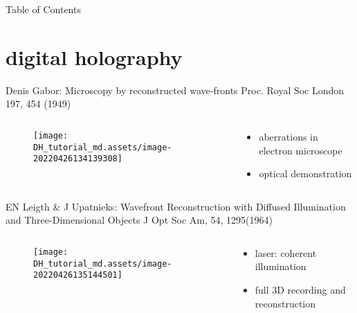 \documentclass[t, aspectratio=169]{beamer}
\begin{document}
\begin{frame}[allowframebreaks]{Table of Contents}
	\tableofcontents[hideallsubsections]
\end{frame}


\section{digital holography}
\begin{frame}[c]
	\centering\LARGE\textbf{\secname}
\end{frame}


\begin{frame}{Denis Gabor: Microscopy by reconstructed wave-fronts}
	\vspace{-3 mm}
	\small Proc. Royal Soc London 197, 454 (1949)
	\begin{columns}
	    \begin{column}{.6\textwidth}
			\begin{figure}
				\texttt{[image: DH\_tutorial\_md.assets/image-20220426134139308]}
			\end{figure}
		\end{column}
		\begin{column}{.4\textwidth}
			\begin{itemize}
				\item aberrations in electron microscope
				\item optical demonstration
			\end{itemize}
		\end{column}
	\end{columns}
\end{frame}


\begin{frame}{EN Leigth \& J Upatnieks: Wavefront Reconstruction with Diffused Illumination and Three-Dimensional Objects}
	\vspace{-3 mm}
	\small J Opt Soc Am, 54, 1295(1964)
	\begin{columns}
		\begin{column}{.6\textwidth}
			\begin{figure}
				\texttt{[image: DH\_tutorial\_md.assets/image-20220426135144501]}
			\end{figure}
		\end{column}
		\begin{column}{.4\textwidth}
			\begin{itemize}
				\item laser: coherent illumination
				\item full 3D recording and reconstruction
			\end{itemize}
		\end{column}
	\end{columns}
\end{frame}
\end{document}
